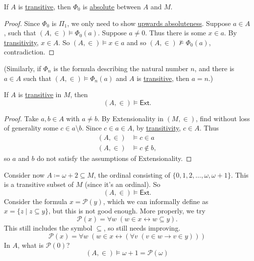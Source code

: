 \documentclass{article}
\newcommand{\named}[1]{\textbf{#1}\index{#1}}
\newcommand{\1}{\mathbbm{1}}
\let\models\vDash
\let\nModels\nvDash
\begin{document}
\begin{prop}
  If $A$ is \hyperlink{def:transitive}{transitive}, then \hyperlink{def:phi0}{$\Phi_0$} is \hyperlink{def:abso}{absolute} between $A$ and $M$.
\end{prop}
\begin{proof}
  Since \hyperlink{def:phi0}{$\Phi_0$} is \hyperlink{def:pi1}{$\Pi_1$}, we only need to show \hyperlink{def:abso}{upwards absoluteness}.
  Suppose $a \in A$, such that $(A,\in) \models \Phi_0(a)$.
  Suppose $a \neq 0$. Thus there is some $x \in a$. By \hyperlink{def:transitive}{transitivity}, $x \in A$.
  So $(A,\in) \models x \in a$ and so $(A,\in) \nModels \Phi_0(a)$, contradiction.
\end{proof}
(Similarly, if $\Phi_n$ is the formula describing the natural number $n$, and there is $a \in A$ such that $(A,\in) \models \Phi_n(a)$ and $A$ is \hyperlink{def:transitive}{transitive}, then $a = n$.)
\begin{prop}
  If $A$ is \hyperlink{def:transitive}{transitive} in $M$, then
  \begin{equation*}
    (A,\in) \models \textsf{Ext}.
  \end{equation*}
\end{prop}
\begin{proof}
  Take $a,b \in A$ with $a \neq b$.
  By Extensionality in $(M,\in)$, find without loss of generality some $c \in a \setminus b$.
  Since $c \in a \in A$, by \hyperlink{def:transitive}{transitivity}, $c \in A$.
  Thus
  \begin{align*}
    (A,\in) &\models c \in a \\
    (A,\in) &\models c \notin b,
  \end{align*}
  so $a$ and $b$ do not satisfy the assumptions of Extensionality.
\end{proof}

Consider now $A \coloneqq \omega + 2 \subseteq M$, the ordinal consisting of $\{0,1,2,\dotsc, \omega, \omega+1\}$.
This is a transitive subset of $M$ (since it's an ordinal).
So
\begin{equation*}
  (A,\in) \models \textsf{Ext}.
\end{equation*}
Consider the formula $x = \mathcal{P}(y)$, which we can informally define as $x = \{z \mid z \subseteq y\}$, but this is not good enough. More properly, we try
\begin{equation*}
  \mathcal{P}(x) = \forall w \; (w \in x \leftrightarrow w \subseteq y).
\end{equation*}
This still includes the symbol $\subseteq$, so still needs improving.
\begin{equation*}
  \mathcal{P}(x) = \forall w \; (w \in x \leftrightarrow (\forall v \; (v \in w \rightarrow v \in y)))
\end{equation*}
In $A$, what is $\mathcal{P}(0)$?
\begin{equation*}
  (A,\in) \models \omega + 1 = \mathcal{P}(\omega)
\end{equation*}
\end{document}
